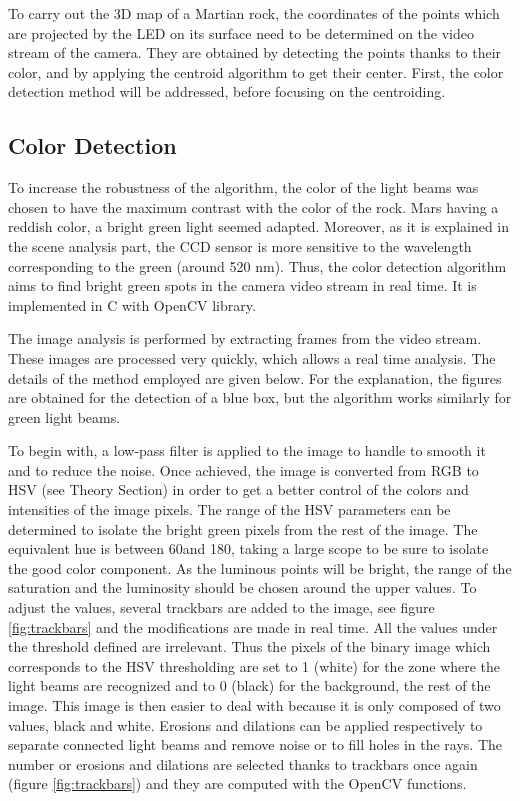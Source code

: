 To carry out the 3D map of a Martian rock, the coordinates of the points which are projected by the LED on its surface need to be determined on the video stream of the camera. They are obtained by detecting the points thanks to their color, and by applying the centroid algorithm to get their center. First, the color detection method will be addressed, before focusing on the centroiding.

\subsection{Color Detection}

To increase the robustness of the algorithm, the color of the light beams was chosen to have the maximum contrast with the color of the rock. Mars having a reddish color, a bright green light seemed adapted. Moreover, as it is explained in the scene analysis part, the CCD sensor is more sensitive to the wavelength corresponding to the green (around 520 nm). Thus, the color detection algorithm aims to find bright green spots in the camera video stream in real time. It is implemented in C with OpenCV library. 

The image analysis is performed by extracting frames from the video stream. These images are processed very quickly, which allows a real time analysis. The details of the method employed are given below. For the explanation, the figures are obtained for the detection of a blue box, but the algorithm works similarly for green light beams.

To begin with, a low-pass filter is applied to the image to handle to smooth it and to reduce the noise. Once achieved, the image is converted from RGB to HSV (see Theory Section) in order to get a better control of the colors and intensities of the image pixels. The range of the HSV parameters can be determined to isolate the bright green pixels from the rest of the image. The equivalent hue is between 60\degree  and 180\degree, taking a large scope to be sure to isolate the good color component. As the luminous points will be bright, the range of the saturation and the luminosity should be chosen around the upper values. To adjust the values, several trackbars are added to the image, see figure \ref{fig:trackbars} and the modifications are made in real time. All the values under the threshold defined are irrelevant. Thus the pixels of the binary image which corresponds to the HSV thresholding are set to 1 (white) for the zone where the light beams are recognized and to 0 (black) for the background, the rest of the image. This image is then easier to deal with because it is only composed of two values, black and white. Erosions and dilations can be applied respectively to separate connected light beams and remove noise or to fill holes in the rays. The number or erosions and dilations are selected thanks to trackbars once again (figure \ref{fig:trackbars}) and they are computed with the OpenCV functions. 

